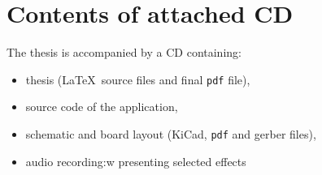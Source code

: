 \documentclass[a4paper,twoside,12pt]{book}
\begin{document}

\chapter*{Contents of attached CD}

The thesis is accompanied by a CD containing:
\begin{itemize}
\item thesis (\LaTeX\ source files and final \texttt{pdf} file),
\item source code of the application,
\item schematic and board layout (KiCad, \texttt{pdf} and gerber files),
\item audio recording:w
 presenting selected effects
\end{itemize}


\end{document}
